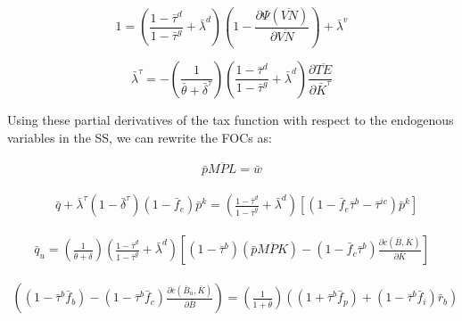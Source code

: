  \begin{equation}
\label{eqn:foc_vn_ss}
 1 = \left(\frac{1-\bar{\tau}^{d}}{1-\bar{\tau}^{g}} + \bar{\lambda}^{d}\right)\left(1-\frac{\partial \Psi(\overline{VN})}{\partial \overline{VN}}\right) + \bar{\lambda}^{v}
\end{equation}

 \begin{equation}
\label{eqn:foc_ktau_ss}
 \bar{\lambda}^{\tau} = -  \left(\frac{1}{\bar{\theta}+\bar{\delta}^{\tau}}\right)\left(\frac{1-\bar{\tau}^{d}}{1-\bar{\tau}^{g}} + \bar{\lambda}^{d} \right)\frac{\partial \overline{TE}}{\partial \bar{K}^{\tau}} 
\end{equation}

Using these partial derivatives of the tax function with respect to the endogenous variables in the SS, we can rewrite the FOCs as:


\begin{equation}
\label{eqn:foc_l_tax_ss}
\begin{split}
 \bar{p}\overline{MPL} = \bar{w} 
 \end{split}
\end{equation}

 \begin{equation}
\label{eqn:foc_i_tax_ss}
\begin{split}
 & \bar{q} + \bar{\lambda}^{\tau}(1-\bar{\delta}^{\tau})(1-\bar{f}_{e})\bar{p}^{k} =  \left(\frac{1-\bar{\tau}^{d}}{1-\bar{\tau}^{g}} + \bar{\lambda}^{d}\right)\left[(1-\bar{f}_{e}\bar{\tau}^{b}-\bar{\tau}^{ic})\bar{p}^{k}\right]
\end{split}
\end{equation}


 \begin{equation}
\label{eqn:foc_k_tax_ss}
\begin{split}
\bar{q}_{u} = \left(\frac{1}{\bar{\theta}+\delta}\right) \left(\frac{1-\bar{\tau}^{d}}{1-\bar{\tau}^{g}} + \bar{\lambda}^{d} \right)\left[(1-\bar{\tau}^{b})\left(\bar{p}\overline{MPK}\right)-(1-\bar{f}_{c}\bar{\tau}^{b}) \frac{\partial c(\bar{B},\bar{K})}{\partial \bar{K}} \right]
\end{split}
\end{equation}

 \begin{equation}
\label{eqn:foc_b_tax}
\begin{split}
 \left((1-\bar{\tau}^{b}\bar{f}_{b})-(1-\bar{\tau}^{b}\bar{f}_{c})\frac{\partial c(\bar{B}_{u},\bar{K})}{\partial \bar{B}}\right)=  \left(\frac{1}{1+\bar{\theta}}\right) \left((1+\bar{\tau}^{b}\bar{f}_{p})+(1-\bar{\tau}^{b}\bar{f}_{i})\bar{r}_{b}\right)
 \end{split}
\end{equation}

